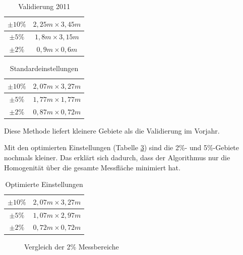 \documentclass[a4paper,bibtotoc,oneside]{scrbook}
\begin{document}
\begin{table}[htbp]
\centering
\begin{tabular}{ | c | c |}\hline
$\pm 10\%$ & $2,25m \times 3,45m$  \\ \hline
$\pm 5\%$ & $1,8m \times 3,15m$    \\ \hline
$\pm 2\%$ & $0,9m \times 0,6m$     \\ \hline
\end{tabular}
\caption{Validierung 2011}\label{Tab11}
\end{table}


\begin{table}[htbp]
\centering
\begin{tabular}{ | c | c |}\hline
$\pm 10\%$ & $2,07m \times 3,27m$  \\ \hline
$\pm 5\%$ & $1,77m \times 1,77m$    \\ \hline
$\pm 2\%$ & $0,87m \times 0,72m$     \\ \hline
\end{tabular}
\caption{Standardeinstellungen}\label{Tabstd}
\end{table}
\noindent Diese Methode liefert kleinere Gebiete als die Validierung im Vorjahr.

\noindent Mit den optimierten Einstellungen (Tabelle \ref{Tabopt}) sind die 2\%- und 5\%-Gebiete nochmals kleiner. Das erklärt sich dadurch, dass der Algorithmus nur die Homogenität über die gesamte Messfläche minimiert hat.
\begin{table}[htbp]
\centering
\begin{tabular}{ | c | c |}\hline
$\pm 10\%$ & $2,07m \times 3,27m$  \\ \hline
$\pm 5\%$ & $1,07m \times 2,97m$    \\ \hline
$\pm 2\%$ & $0,72m \times 0,72m$     \\ \hline
\end{tabular}
\caption{Optimierte Einstellungen}\label{Tabopt}
\end{table}

\FloatBarrier

\begin{figure}
\caption{Vergleich der 2\% Messbereiche}
\label{zwei}
\end{figure} 
\end{document}
